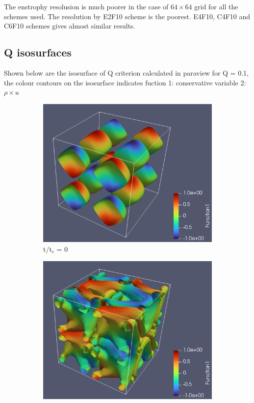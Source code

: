 \documentclass{hcmut-report}
\begin{document}
    The enstrophy resolusion is much poorer in the case of $64\times64$ grid for all the schemes used. The resolution by E2F10 scheme is the poorest. E4F10, C4F10 and C6F10 schemes gives almost similar results.

    \subsection{Q isosurfaces}
    Shown below are the isosurface of Q criterion calculated in paraview for Q = 0.1, the colour contours on the isosurface indicates fuction 1: conservative variable 2: $\rho\times u$

    \begin{figure}[H]
     \centering
     \begin{subfigure}[b]{0.35\textwidth}
         \centering
         \includegraphics[width=\textwidth]{graphics/iso000.png}
         \caption{t/t$_c$ = 0}
         \label{fig:3.1}
     \end{subfigure}
     \hspace{0.5cm}
     \begin{subfigure}[b]{0.35\textwidth}
         \centering
         \includegraphics[width=\textwidth]{graphics/iso004.png}

\end{subfigure}
\end{figure}
\end{document}
